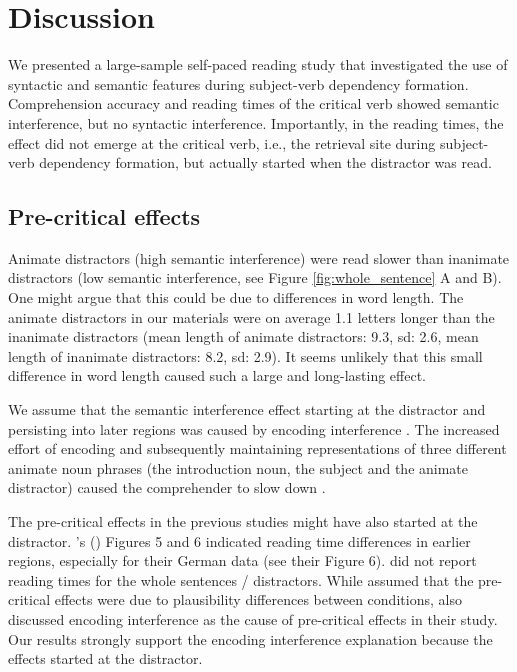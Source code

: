 \documentclass[a4paper, man, floatsintext]{apa7}
\begin{document}
\section{Discussion}
We presented a large-sample self-paced reading study that investigated the use of syntactic and semantic features during subject-verb dependency formation. Comprehension accuracy and reading times of the critical verb showed semantic interference, but no syntactic interference. Importantly, in the reading times, the effect did not emerge at the critical verb, i.e., the retrieval site during subject-verb dependency formation, but actually started when the distractor was read. 

\subsection{Pre-critical effects}
Animate distractors (high semantic interference) were read slower than inanimate distractors (low semantic interference, see Figure \ref{fig:whole_sentence} A and B). One might argue that this could be due to differences in word length. The animate distractors in our materials were on average 1.1 letters longer than the inanimate distractors (mean length of animate distractors: 9.3, sd: 2.6, mean length of inanimate distractors: 8.2, sd: 2.9). It seems unlikely that this small difference in word length caused such a large and long-lasting effect.

We assume that the semantic interference effect starting at the distractor and persisting into later regions was caused by encoding interference \citep{Oberauer_Kliegl_2006}. The increased effort of encoding and subsequently maintaining representations of three different animate noun phrases (the introduction noun, the subject and the animate distractor) caused the comprehender to slow down \citep[for similar findings, see e.g., ][]{lago_etal_2021, kush_etal_2015, gordon02}. 

The pre-critical effects in the previous studies \citep{vandyke07, mertzen} might have also started at the distractor. \citeauthor{mertzen}'s (\citeyear{mertzen}) Figures 5 and 6 indicated reading time differences in earlier regions, especially for their German data (see their Figure 6). \citet{vandyke07} did not report reading times for the whole sentences / distractors. While \citet{vandyke07} assumed that the pre-critical effects were due to plausibility differences between conditions, \citet{mertzen} also discussed encoding interference as the cause of pre-critical effects in their study. Our results strongly support the encoding interference explanation because the effects started at the distractor.
\end{document}
